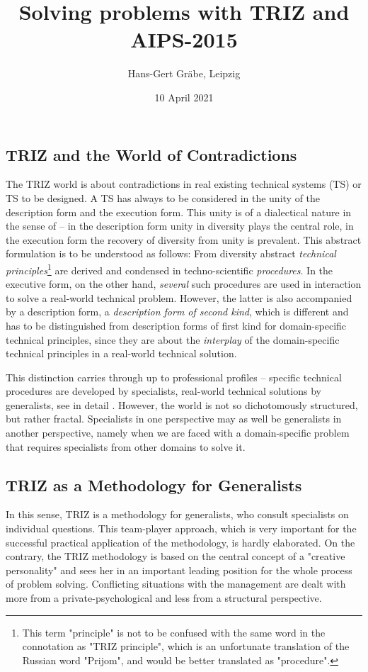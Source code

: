 \documentclass[11pt,a4paper]{article}
\title{Solving problems with TRIZ and AIPS-2015}
\author{Hans-Gert Gr\"abe, Leipzig}
\date{10 April 2021}
\begin{document}
\maketitle

\subsection*{TRIZ and the World of Contradictions}

The TRIZ world is about contradictions in real existing technical systems (TS)
or TS to be designed. A TS has always to be considered in the unity of the
description form and the execution form. This unity is of a dialectical nature
in the sense of \cite{Graebe2020} -- in the description form unity in
diversity plays the central role, in the execution form the recovery of
diversity from unity is prevalent.  This abstract formulation is to be
understood as follows: From diversity abstract \emph{technical
  principles}\footnote{This term "principle" is not to be confused with the
  same word in the connotation as "TRIZ principle", which is an unfortunate
  translation of the Russian word "Prijom", and would be better translated as
  "procedure".} are derived and condensed in techno-scientific
\emph{procedures}.  In the executive form, on the other hand, \emph{several}
such procedures are used in interaction to solve a real-world technical
problem.  However, the latter is also accompanied by a description form, a
\emph{description form of second kind}, which is different and has to be
distinguished from description forms of first kind for domain-specific
technical principles, since they are about the \emph{interplay} of the
domain-specific technical principles in a real-world technical solution.

This distinction carries through up to professional profiles -- specific
technical procedures are developed by specialists, real-world technical
solutions by generalists, see in detail \cite[section 9]{Graebe2020}.
However, the world is not so dichotomously structured, but rather fractal.
Specialists in one perspective may as well be generalists in another
perspective, namely when we are faced with a domain-specific problem that
requires specialists from other domains to solve it.

\subsection*{TRIZ as a Methodology for Generalists}

In this sense, TRIZ is a methodology for generalists, who consult specialists
on individual questions. This team-player approach, which is very important
for the successful practical application of the methodology, is hardly
elaborated.  On the contrary, the TRIZ methodology is based on the central
concept of a "creative personality" and sees her in an important leading
position for the whole process of problem solving. Conflicting situations with
the management are dealt with more from a private-psychological and less from
a structural perspective.
\end{document}
